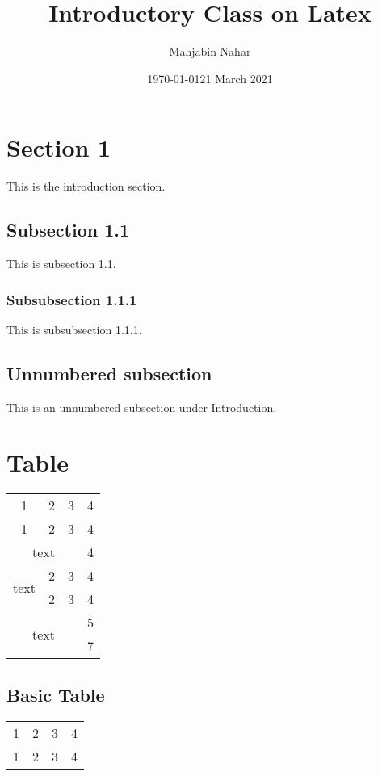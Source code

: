 \documentclass[14pt, a4paper]{article} %
\title{Introductory Class on Latex}
\author{Mahjabin Nahar}
\date{\today}
\date{21 March 2021}
\begin{document}
\maketitle
\tableofcontents %
\pagebreak %

\section{Section 1}
\label{sec:intro} %
This is the introduction section.


\subsection{Subsection 1.1}
\label{subsec:1.1} %
This is subsection 1.1.


\subsubsection{Subsubsection 1.1.1}
This is subsubsection 1.1.1.


\subsection*{Unnumbered subsection}
This is an unnumbered subsection under Introduction. 

\section{Table}

\begin{tabular}{|c|c|c|c|}
    \hline
	1 & 2 & 3 & 4 \\ 
	\cline{1-3}
	1 & 2 & 3 & 4  \\
	\hline
	\multicolumn{3}{|c|}{text} & 4 \\
	\hline
	\multirow{2}{*}{text} & 2 & 3 & 4\\
	\cline{2-4}
	& 2 & 3 & 4 \\
	\hline
	\multicolumn{3}{|c|}{\multirow{2}{*}{text}} & 5 \\
	\multicolumn{3}{|c|}{} & 7 \\
	\hline
\end{tabular}

\subsection{Basic Table}
\begin{tabular}{|c|ccc|}
	\hline
	1 & 2 & 3 & 4 \\ 
	\cline{1-3}
	1 & 2 & 3 & 4  \\
	\hline

\end{tabular}
\end{document}
